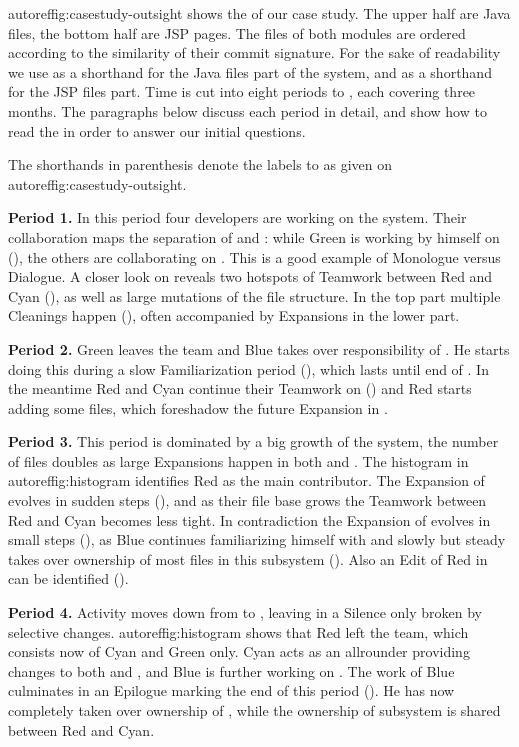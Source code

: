\documentclass[10pt]{book}
\begin{document}
autoref{fig:casestudy-outsight} shows the \omap of our case study. The upper half are Java files, the bottom half are JSP pages. The files of both modules are ordered according to the similarity of their commit signature. For the sake of readability we use  as a shorthand for the Java files part of the system, and  as a shorthand for the JSP files part. Time is cut into eight periods  to , each covering three months. The paragraphs below discuss each period in detail, and show how to read the \omap in order to answer our initial questions.

The shorthands in parenthesis denote the labels  to  as given on autoref{fig:casestudy-outsight}.

\textbf{Period 1.} In this period four developers are working on the system. Their collaboration maps the separation of  and : while Green is working by himself on  (), the others are collaborating on . This is a good example of Monologue versus Dialogue. A closer look on  reveals two hotspots of Teamwork between Red and Cyan (), as well as large mutations of the file structure. In the top part multiple Cleanings happen (), often accompanied by Expansions in the lower part.

\textbf{Period 2.} Green leaves the team and Blue takes over responsibility of . He starts doing this during a slow Familiarization period (), which lasts until end of . In the meantime Red and Cyan continue their Teamwork on  () and Red starts adding some files, which foreshadow the future Expansion in .

\textbf{Period 3.} This period is dominated by a big growth of the system, the number of files doubles as large Expansions happen in both  and . The histogram in autoref{fig:histogram} identifies Red as the main contributor. The Expansion of  evolves in sudden steps (), and as their file base grows the Teamwork between Red and Cyan becomes less tight. In contradiction the Expansion of  evolves in small steps (), as Blue continues familiarizing himself with  and slowly but steady takes over ownership of most files in this subsystem (). Also an Edit of Red in  can be identified ().

\textbf{Period 4.} Activity moves down from  to , leaving  in a Silence only broken by selective changes. autoref{fig:histogram} shows that Red left the team, which consists now of Cyan and Green only. Cyan acts as an allrounder providing changes to both  and , and Blue is further working on . The work of Blue culminates in an Epilogue marking the end of this period (). He has now completely taken over ownership of , while the ownership of subsystem  is shared between Red and Cyan.
\end{document}
